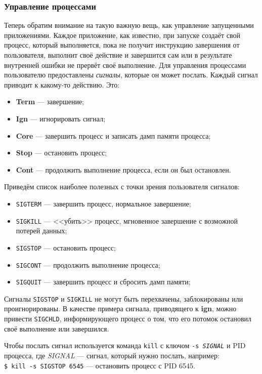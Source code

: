\subsubsection{Управление процессами}\label{base:os:structure:userutils:processes}
Теперь обратим внимание на такую важную вещь, как управление запущенными приложениями. Каждое приложение, как известно, при запуске создаёт свой процесс, который выполняется, пока не получит инструкцию завершения от пользователя, выполнит своё действие и завершится сам или в результате внутренней ошибки не прервёт своё выполнение.
Для управления процессами пользователю предоставлены \emph{сигналы}, которые он может послать. Каждый сигнал приводит к какому-то действию. Это:
\begin{itemize}
 \item \textbf{Term} --- завершение;
 \item \textbf{Ign} --- игнорировать сигнал;
 \item \textbf{Core} --- завершить процесс и записать дамп памяти процесса;
 \item \textbf{Stop} --- остановить процесс;
 \item \textbf{Cont} --- продолжить выполнение процесса, если он был остановлен.
\end{itemize}
Приведём список наиболее полезных с точки зрения пользователя сигналов:
\begin{itemize}
 \item \texttt{SIGTERM} --- завершить процесс, нормальное завершение;
 \item \texttt{SIGKILL} --- <<убить>> процесс, мгновенное завершение с возможной потерей данных;
 \item \texttt{SIGSTOP} --- остановить процесс;
 \item \texttt{SIGCONT} --- продолжить выполнение процесса;
 \item \texttt{SIGQUIT} --- завершить процесс и сбросить дамп памяти;
\end{itemize}
Сигналы \texttt{SIGSTOP} и \texttt{SIGKILL} не могут быть перехвачены, заблокированы или проигнорированы. В качестве примера сигнала, приводящего к \textbf{ign}, можно привести \texttt{SIGCHLD}, информирующего процесс о том, что его потомок остановил своё выполнение или завершился.

Чтобы послать сигнал используется команда \texttt{kill} с ключом \texttt{-s \emph{SIGNAL}} и PID процесса, где \emph{SIGNAL} --- сигнал, который нужно послать, например:\\
\texttt{\$ kill -s SIGSTOP 6545} --- остановить процесс с PID 6545.


